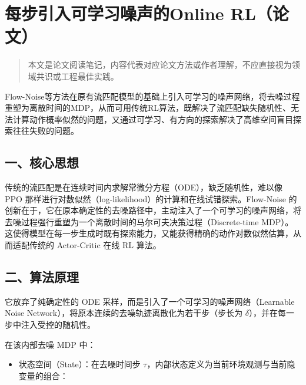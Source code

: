 \clearpage

\hypertarget{ux6bcfux6b65ux5f15ux5165ux53efux5b66ux4e60ux566aux58f0ux7684online-rlux8bbaux6587}{%
\section{每步引入可学习噪声的Online RL（论文）}\label{ux6bcfux6b65ux5f15ux5165ux53efux5b66ux4e60ux566aux58f0ux7684online-rlux8bbaux6587}}

\begin{quote}
本文是论文阅读笔记，内容代表对应论文方法或作者理解，不应直接视为领域共识或工程最佳实践。
\end{quote}

Flow-Noise等方法在原有流匹配模型的基础上引入可学习的噪声网络，将去噪过程重塑为离散时间的MDP，从而可用传统RL算法，既解决了流匹配缺失随机性、无法计算动作概率似然的问题，又通过可学习、有方向的探索解决了高维空间盲目探索往往失败的问题。

\hypertarget{ux4e00ux6838ux5fc3ux601dux60f3-19}{%
\subsection{一、核心思想}\label{ux4e00ux6838ux5fc3ux601dux60f3-19}}

传统的流匹配是在连续时间内求解常微分方程（ODE），缺乏随机性，难以像 PPO 那样进行对数似然（log-likelihood）的计算和在线试错探索。Flow-Noise 的创新在于，它在原本确定性的去噪路径中，主动注入了一个可学习的噪声网络，将去噪过程强行重塑为一个离散时间的马尔可夫决策过程（Discrete-time MDP）。这使得模型在每一步生成时既有探索能力，又能获得精确的动作对数似然估算，从而适配传统的 Actor-Critic 在线 RL 算法。

\hypertarget{ux4e8cux7b97ux6cd5ux539fux7406}{%
\subsection{二、算法原理}\label{ux4e8cux7b97ux6cd5ux539fux7406}}

它放弃了纯确定性的 ODE 采样，而是引入了一个可学习的噪声网络（Learnable Noise Network），将原本连续的去噪轨迹离散化为若干步（步长为 \(\delta\)），并在每一步中注入受控的随机性。

在该内部去噪 MDP 中：

\begin{itemize}
\tightlist
\item
  状态空间（State）：在去噪时间步 \(\tau\)，内部状态定义为当前环境观测与当前隐变量的组合：
\end{itemize}

